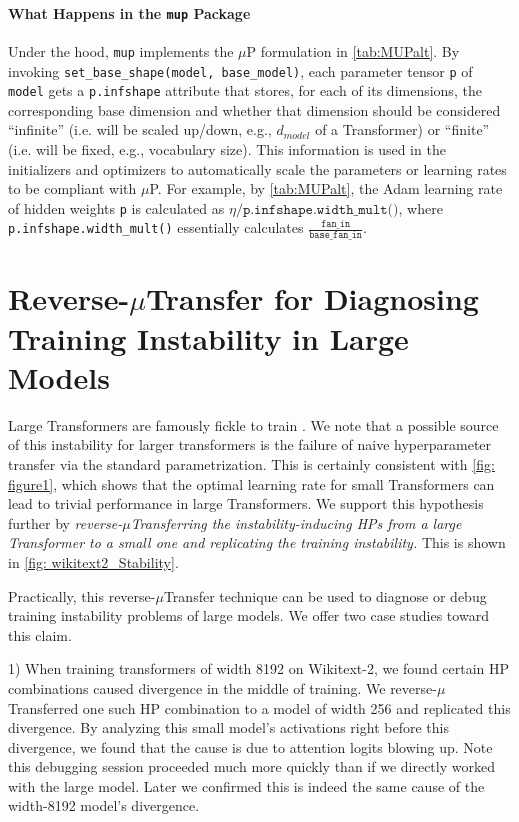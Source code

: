 \documentclass{article}
\theoremstyle{definition}
\begin{document}
\paragraph{What Happens in the \texttt{mup} Package}

Under the hood, \texttt{mup} implements the $\mu$P formulation in \cref{tab:MUPalt}.
By invoking \texttt{set\_base\_shape(model, base\_model)}, each parameter tensor \texttt{p} of \texttt{model} gets a \texttt{p.infshape} attribute that stores, for each of its dimensions, the corresponding base dimension and whether that dimension should be considered ``infinite'' (i.e. will be scaled up/down, e.g., $d_{model}$ of a Transformer) or ``finite'' (i.e. will be fixed, e.g., vocabulary size).
This information is used in the initializers and optimizers to automatically scale the parameters or learning rates to be compliant with $\mu$P.
For example, by \cref{tab:MUPalt}, the Adam learning rate of hidden weights \texttt{p} is calculated as $\eta / \texttt{p.infshape.width\_mult()}$, where \texttt{p.infshape.width\_mult()} essentially calculates $\frac{\texttt{fan\_in}}{\texttt{base\_fan\_in}}.$

\section{Reverse-\texorpdfstring{$\mu$}{mu}Transfer for Diagnosing Training Instability in Large Models}
\label{sec:trainingstability}

Large Transformers are famously fickle to train \citep{popel_training_2018,liu-etal-2020-understanding}.
We note that a possible source of this instability for larger transformers is the failure of naive hyperparameter transfer via the standard parametrization.
This is certainly consistent with \cref{fig: figure1}, which shows that the optimal learning rate for small Transformers can lead to trivial performance in large Transformers.
We support this hypothesis further by \emph{reverse-$\mu$Transferring the instability-inducing HPs from a large Transformer to a small one and replicating the training instability.}
This is shown in \cref{fig: wikitext2_Stability}.

Practically, this reverse-$\mu$Transfer technique can be used to diagnose or debug training instability problems of large models.
We offer two case studies toward this claim.

1) When training transformers of width 8192 on Wikitext-2, we found certain HP combinations caused divergence in the middle of training.
We reverse-$\mu$Transferred one such HP combination to a model of width 256 and replicated this divergence.
By analyzing this small model's activations right before this divergence, we found that the cause is due to attention logits blowing up.
Note this debugging session proceeded much more quickly than if we directly worked with the large model.
Later we confirmed this is indeed the same cause of the width-8192 model's divergence.
\end{document}
